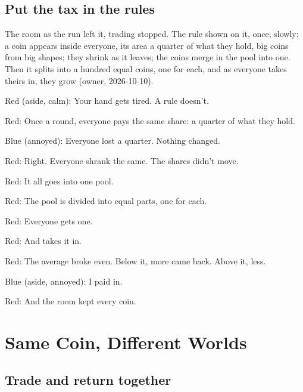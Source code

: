 \subsection{Put the tax in the rules}\label{act:levy}

\label{levy}

The room as the run left it, trading stopped. The rule shown on it, once,
slowly: a coin appears inside everyone, its area a quarter of what they
hold, big coins from big shapes; they shrink as it leaves; the coins merge
in the pool into one. Then it splits into a hundred equal coins, one for
each, and as everyone takes theirs in, they grow (owner, 2026-10-10).

Red (aside, calm): Your hand gets tired.
A rule doesn't.

Red: Once a round, everyone pays the same share:
a quarter of what they hold.

Blue (annoyed): Everyone lost a quarter.
Nothing changed.

Red: Right. Everyone shrank the same.
The shares didn't move.

Red: It all goes into one pool.

Red: The pool is divided into equal parts,
one for each.

Red: Everyone gets one.

Red: And takes it in.

Red: The average broke even.
Below it, more came back. Above it, less.

Blue (aside, annoyed): I paid in.

Red: And the room kept every coin.

\section{Same Coin, Different Worlds}\label{index:same-coin-different-worlds}

\subsection{Trade and return together}\label{act:match}

